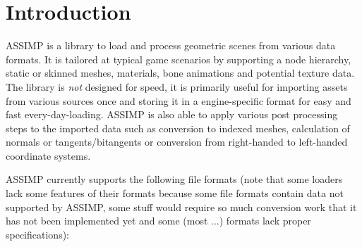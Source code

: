 \hypertarget{index_intro}{}\section{Introduction}\label{index_intro}
A\+S\+S\+I\+M\+P is a library to load and process geometric scenes from various data formats. It is tailored at typical game scenarios by supporting a node hierarchy, static or skinned meshes, materials, bone animations and potential texture data. The library is {\itshape not} designed for speed, it is primarily useful for importing assets from various sources once and storing it in a engine-\/specific format for easy and fast every-\/day-\/loading. A\+S\+S\+I\+M\+P is also able to apply various post processing steps to the imported data such as conversion to indexed meshes, calculation of normals or tangents/bitangents or conversion from right-\/handed to left-\/handed coordinate systems.

A\+S\+S\+I\+M\+P currently supports the following file formats (note that some loaders lack some features of their formats because some file formats contain data not supported by A\+S\+S\+I\+M\+P, some stuff would require so much conversion work that it has not been implemented yet and some (most ...) formats lack proper specifications)\+: 

